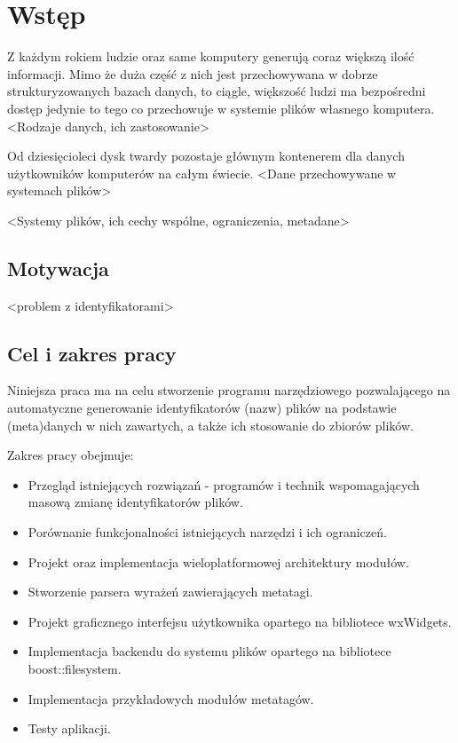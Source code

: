 \chapter{Wstęp}

\par
Z każdym rokiem ludzie oraz same komputery generują coraz większą ilość informacji.
Mimo że duża część z nich jest przechowywana w dobrze strukturyzowanych bazach danych, to ciągle, większość ludzi ma bezpośredni dostęp jedynie to tego co przechowuje w systemie plików własnego komputera.
<Rodzaje danych, ich zastosowanie>

\par
Od dziesięcioleci dysk twardy pozostaje głównym kontenerem dla danych użytkowników komputerów na całym świecie. 
<Dane przechowywane w systemach plików>

\par
<Systemy plików, ich cechy wspólne, ograniczenia, metadane>

\section{Motywacja}
<problem z identyfikatorami>

\section{Cel i zakres pracy}
\par
Niniejsza praca ma na celu stworzenie programu narzędziowego pozwalającego na automatyczne generowanie identyfikatorów (nazw) plików na podstawie (meta)danych w nich zawartych, a także ich stosowanie do zbiorów plików.

\par
Zakres pracy obejmuje:
\begin{itemize}
\item Przegląd istniejących rozwiązań - programów i technik wspomagających masową zmianę identyfikatorów plików.
\item Porównanie funkcjonalności istniejących narzędzi i ich ograniczeń.
\item Projekt oraz implementacja wieloplatformowej architektury modułów.
\item Stworzenie parsera wyrażeń zawierających metatagi.
\item Projekt graficznego interfejsu użytkownika opartego na bibliotece wxWidgets.
\item Implementacja backendu do systemu plików opartego na bibliotece boost::filesystem.
\item Implementacja przykładowych modułów metatagów.
\item Testy aplikacji.
\end{itemize}

